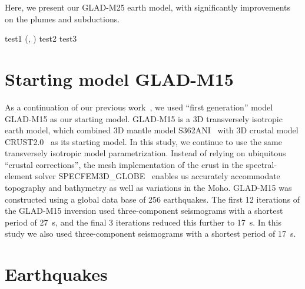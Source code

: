 \documentclass[extra,mreferee]{gji}
\begin{document}
Here, we present our GLAD-M25 earth model, with significantly improvements on the plumes and subductions.

test1 (\cite{zhu2012structure}, \cite{zhu2012structure})
test2 \citep{zhu2015seismic, ekstrom2012global}
test3 \citet{ekstrom2012global}


\section{Starting model GLAD-M15}

As a continuation of our previous work~\citep{bozdaug2016global},
we used ``first generation'' model GLAD-M15 as our
starting model.
GLAD-M15 is a 3D transversely isotropic earth model, which combined
3D mantle model S362ANI~\citep{kustowski2008anisotropic}
with 3D crustal model CRUST2.0~\citep{bassin2000current} as its starting model.
In this study,
we continue to use the same transversely isotropic model parametrization.
Instead of relying on ubiquitous ``crustal corrections'',
the mesh implementation of the crust in the spectral-element solver SPECFEM3D\_GLOBE~\citep{KoTr02a,KoTr02b,PeKoLuMaLeCaLeMaLiBlNiBaTr11} enables us accurately accommodate topography and bathymetry as well as variations in the Moho.
GLAD-M15 was constructed using a global data base of 256 earthquakes.
The first 12 iterations of the GLAD-M15 inversion used three-component seismograms with a shortest period of 27~s,
and the final 3 iterations reduced this further to 17~s.
In this study we also used three-component seismograms with a shortest period of 17~s.

\section{Earthquakes}
\label{section:earthquakes}
\end{document}
